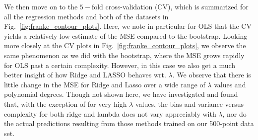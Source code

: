 \documentclass[reprint, english, nofootinbib]{revtex4-2}
\begin{document}
We then move on to the $5-$fold cross-validation (CV), which is summarized for all the regression methods and both of the datasets in Fig.~\ref{fig:franke_contour_plots}. Here, we note in particular for OLS that the CV yields a relatively low estimate of the MSE compared to the bootstrap.
Looking more closely at the CV plots in Fig.~\ref{fig:franke_contour_plots}, we observe the same phenomenon as we did with the bootstrap, where the MSE grows rapidly for OLS past a certain complexity. However, in this case we also get a much better insight of how Ridge and LASSO behaves wrt. $\lambda$. We observe that there is little change in the MSE for Ridge and Lasso over a wide range of $\lambda$ values and polynomial degrees. Though not shown here, we have investigated and found that, with the exception of for very high $\lambda$-values, the bias and variance versus complexity for both ridge and lambda does not vary appreciably with $\lambda$, nor do the actual predictions resulting from those methods trained on our 500-point data set.


\end{document}
